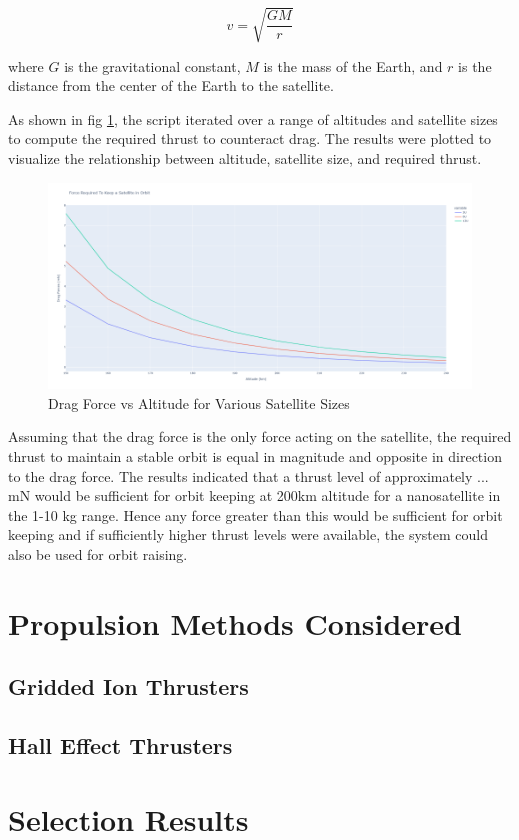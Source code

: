\begin{equation}
    v = \sqrt{\frac{GM}{r}}
\end{equation}

where \( G \) is the gravitational constant, \( M \) is the mass of the Earth, and \( r \) is the distance from the center of the Earth to the satellite.


As shown in fig \ref{fig:drag_force_vs_altitude}, the script iterated over a range of altitudes and satellite sizes to compute the required thrust to counteract drag. The results were plotted to visualize the relationship between altitude, satellite size, and required thrust.

\begin{figure}[H]
    \centering
    \includegraphics[width=1.0\textwidth]{images/Misc/150km - 240km.png}
    \caption{Drag Force vs Altitude for Various Satellite Sizes}
    \label{fig:drag_force_vs_altitude}
\end{figure}

Assuming that the drag force is the only force acting on the satellite, the required thrust to maintain a stable orbit is equal in magnitude and opposite in direction to the drag force. The results indicated that a thrust level of approximately ... mN would be sufficient for orbit keeping at 200km altitude for a nanosatellite in the 1-10 kg range. Hence any force greater than this would be sufficient for orbit keeping and if sufficiently higher thrust levels were available, the system could also be used for orbit raising.

\section{Propulsion Methods Considered}

\subsection{Gridded Ion Thrusters}

\subsection{Hall Effect Thrusters}

\section{Selection Results}

